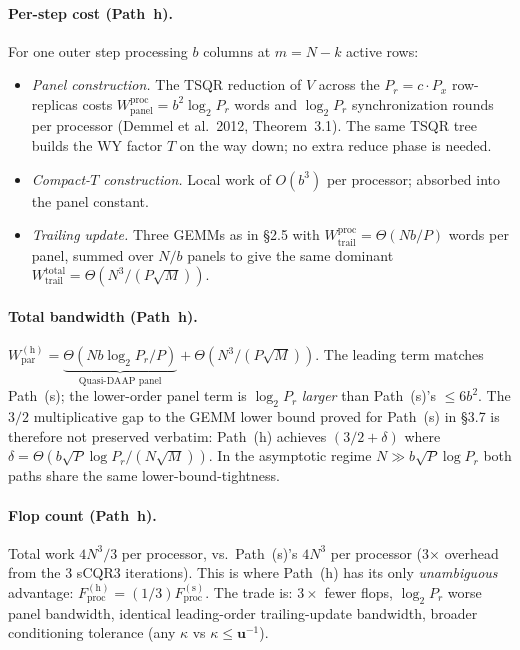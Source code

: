 \documentclass[11pt]{article}
\begin{document}
\paragraph{Per-step cost (Path~h).}
For one outer step processing $b$ columns at $m = N - k$ active rows:
\begin{itemize}[leftmargin=2em]
  \item \emph{Panel construction.} The TSQR reduction of $V$ across the
    $P_r = c \cdot P_x$ row-replicas costs
    $W_{\mathrm{panel}}^{\mathrm{proc}} = b^2 \log_2 P_r$ words and
    $\log_2 P_r$ synchronization rounds per processor (Demmel et al.\
    2012, Theorem~3.1). The same TSQR tree builds the WY factor $T$ on
    the way down; no extra reduce phase is needed.
  \item \emph{Compact-$T$ construction.} Local work of $O(b^3)$ per
    processor; absorbed into the panel constant.
  \item \emph{Trailing update.} Three GEMMs as in §2.5 with
    $W_{\mathrm{trail}}^{\mathrm{proc}} = \Theta(N b / P)$ words per
    panel, summed over $N/b$ panels to give the same dominant
    $W_{\mathrm{trail}}^{\mathrm{total}} = \Theta(N^3 / (P\sqrt{M}))$.
\end{itemize}

\paragraph{Total bandwidth (Path~h).}
$W_{\mathrm{par}}^{\mathrm{(h)}} =
 \underbrace{\Theta(N b \log_2 P_r / P)}_{\text{Quasi-DAAP panel}}
 + \Theta(N^3 / (P\sqrt{M}))$.
The leading term matches Path~(s); the lower-order panel term is
$\log_2 P_r$ \emph{larger} than Path~(s)'s $\le 6 b^2$. The
$3/2$ multiplicative gap to the GEMM lower bound proved for Path~(s)
in §3.7 is therefore not preserved verbatim: Path~(h) achieves
$(3/2 + \delta)$ where $\delta = \Theta(b\sqrt{P}\log P_r /
(N\sqrt{M}))$. In the asymptotic regime $N \gg b\sqrt{P}\log P_r$ both
paths share the same lower-bound-tightness.

\paragraph{Flop count (Path~h).}
Total work $4 N^3 / 3$ per processor, vs.\ Path~(s)'s $4 N^3$ per
processor (3$\times$ overhead from the 3 sCQR3 iterations). This is
where Path~(h) has its only \emph{unambiguous} advantage:
$F^{\mathrm{(h)}}_{\mathrm{proc}} = (1/3) F^{\mathrm{(s)}}_{\mathrm{proc}}$.
The trade is: $3\times$ fewer flops, $\log_2 P_r$ worse panel
bandwidth, identical leading-order trailing-update bandwidth, broader
conditioning tolerance (any $\kappa$ vs $\kappa \le \mathbf{u}^{-1}$).
\end{document}
